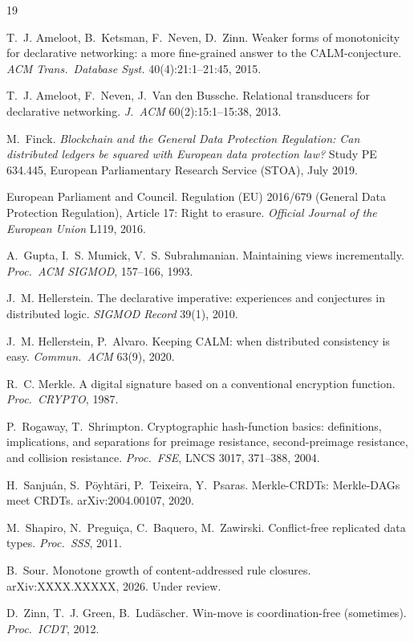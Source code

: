 \documentclass[11pt]{article}
\theoremstyle{definition}
\theoremstyle{remark}
\begin{document}
\begin{thebibliography}{19}\small

 T.~J. Ameloot, B.~Ketsman, F.~Neven, D.~Zinn.
Weaker forms of monotonicity for declarative networking: a more fine-grained answer to the CALM-conjecture.
\emph{ACM Trans.\ Database Syst.} 40(4):21:1--21:45, 2015.

 T.~J. Ameloot, F.~Neven, J.~Van den Bussche.
Relational transducers for declarative networking.
\emph{J.~ACM} 60(2):15:1--15:38, 2013.

 M.~Finck.
\emph{Blockchain and the General Data Protection Regulation: Can distributed ledgers be squared with European data protection law?}
Study PE 634.445, European Parliamentary Research Service (STOA), July 2019.

 European Parliament and Council.
Regulation (EU) 2016/679 (General Data Protection Regulation), Article 17: Right to erasure.
\emph{Official Journal of the European Union} L119, 2016.

 A.~Gupta, I.~S. Mumick, V.~S. Subrahmanian.
Maintaining views incrementally.
\emph{Proc.\ ACM SIGMOD}, 157--166, 1993.

 J.~M. Hellerstein.
The declarative imperative: experiences and conjectures in distributed logic.
\emph{SIGMOD Record} 39(1), 2010.

 J.~M. Hellerstein, P.~Alvaro.
Keeping CALM: when distributed consistency is easy.
\emph{Commun.\ ACM} 63(9), 2020.

 R.~C. Merkle.
A digital signature based on a conventional encryption function.
\emph{Proc.\ CRYPTO}, 1987.

 P.~Rogaway, T.~Shrimpton.
Cryptographic hash-function basics: definitions, implications, and separations for preimage resistance, second-preimage resistance, and collision resistance.
\emph{Proc.\ FSE}, LNCS 3017, 371--388, 2004.

 H.~Sanju\'an, S.~P\"oyht\"ari, P.~Teixeira, Y.~Psaras.
Merkle-CRDTs: Merkle-DAGs meet CRDTs.
arXiv:2004.00107, 2020.

 M.~Shapiro, N.~Pregui\c{c}a, C.~Baquero, M.~Zawirski.
Conflict-free replicated data types.
\emph{Proc.\ SSS}, 2011.

 B.~Sour.
Monotone growth of content-addressed rule closures.
arXiv:XXXX.XXXXX, 2026. Under review.

 D.~Zinn, T.~J. Green, B.~Lud\"ascher.
Win-move is coordination-free (sometimes).
\emph{Proc.\ ICDT}, 2012.

\end{thebibliography}
\end{document}
